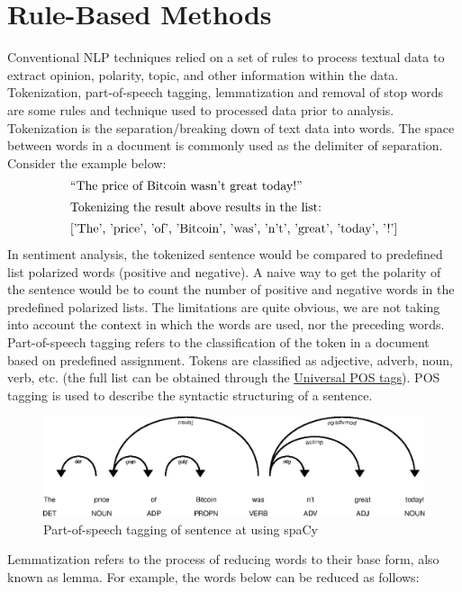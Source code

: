 \par 

\section{Rule-Based Methods}
Conventional NLP techniques relied on a set of rules to process textual data to extract opinion, polarity, topic, and other information within the data. Tokenization, part-of-speech tagging, lemmatization and removal of stop words are some rules and technique used to processed data prior to analysis. Tokenization is the separation/breaking down of text data into words. The space between words in a document is commonly used as the delimiter of separation. Consider the example below:
\begin{align}
    \label{POS_example_sent}
    &\text{“The price of Bitcoin wasn’t great today!”}\\
\intertext{Tokenizing the result above results in the list:}
    &\text{['The', 'price', 'of', 'Bitcoin', 'was',  'n’t', 'great', 'today', '!']}
\end{align}
In sentiment analysis, the tokenized sentence would be compared to predefined list polarized words (positive and negative). A naive way to get the polarity of the sentence would be to count the number of positive and negative words in the predefined polarized lists. The limitations are quite obvious, we are not taking into account the context in which the words are used, nor the preceding words. Part-of-speech tagging refers to the classification of the token in a document based on predefined assignment. Tokens are classified as adjective,  adverb, noun, verb, etc. (the full list can be obtained through the \href{https://universaldependencies.org/u/pos/}{Universal POS tags}). POS tagging is used to describe the syntactic structuring of a sentence.
\begin{figure}[H]
    \centering
    \includegraphics[scale=0.8]{CHAPTER_4/POS_tagging.eps}
    \caption{Part-of-speech tagging of sentence at  using spaCy}
    \label{PSO_EXAMPLE}
  \end{figure}
Lemmatization refers to the process of reducing words  to their base form, also known as lemma. For example, the words below can be reduced as follows:
